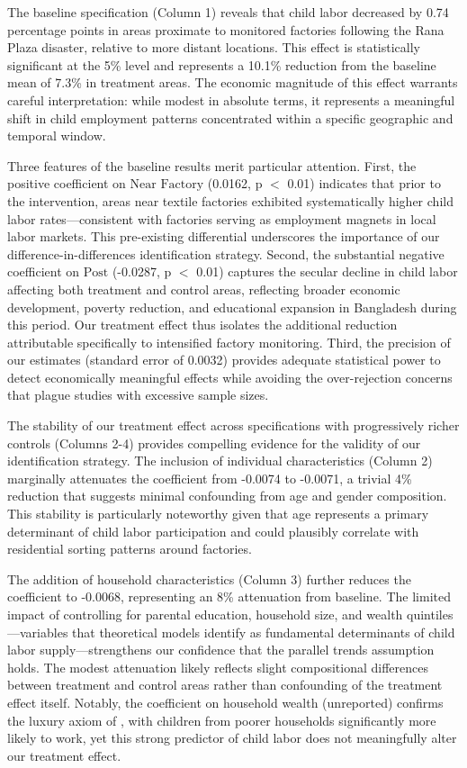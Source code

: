\documentclass[12pt]{article}
\begin{document}
The baseline specification (Column 1) reveals that child labor decreased by 0.74 percentage points in areas proximate to monitored factories following the Rana Plaza disaster, relative to more distant locations. This effect is statistically significant at the 5\% level and represents a 10.1\% reduction from the baseline mean of 7.3\% in treatment areas. The economic magnitude of this effect warrants careful interpretation: while modest in absolute terms, it represents a meaningful shift in child employment patterns concentrated within a specific geographic and temporal window.

Three features of the baseline results merit particular attention. First, the positive coefficient on $\text{Near Factory}$ (0.0162, p $<$ 0.01) indicates that prior to the intervention, areas near textile factories exhibited systematically higher child labor rates—consistent with factories serving as employment magnets in local labor markets. This pre-existing differential underscores the importance of our difference-in-differences identification strategy. Second, the substantial negative coefficient on $\text{Post}$ (-0.0287, p $<$ 0.01) captures the secular decline in child labor affecting both treatment and control areas, reflecting broader economic development, poverty reduction, and educational expansion in Bangladesh during this period. Our treatment effect thus isolates the additional reduction attributable specifically to intensified factory monitoring. Third, the precision of our estimates (standard error of 0.0032) provides adequate statistical power to detect economically meaningful effects while avoiding the over-rejection concerns that plague studies with excessive sample sizes.

The stability of our treatment effect across specifications with progressively richer controls (Columns 2-4) provides compelling evidence for the validity of our identification strategy. The inclusion of individual characteristics (Column 2) marginally attenuates the coefficient from -0.0074 to -0.0071, a trivial 4\% reduction that suggests minimal confounding from age and gender composition. This stability is particularly noteworthy given that age represents a primary determinant of child labor participation and could plausibly correlate with residential sorting patterns around factories.

The addition of household characteristics (Column 3) further reduces the coefficient to -0.0068, representing an 8\% attenuation from baseline. The limited impact of controlling for parental education, household size, and wealth quintiles—variables that theoretical models identify as fundamental determinants of child labor supply—strengthens our confidence that the parallel trends assumption holds. The modest attenuation likely reflects slight compositional differences between treatment and control areas rather than confounding of the treatment effect itself. Notably, the coefficient on household wealth (unreported) confirms the luxury axiom of \cite{basu1998economics}, with children from poorer households significantly more likely to work, yet this strong predictor of child labor does not meaningfully alter our treatment effect.
\end{document}
